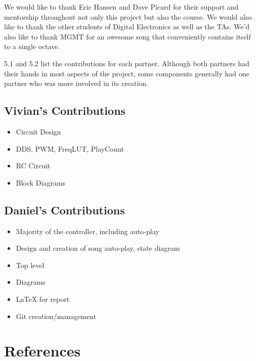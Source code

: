 \documentclass{article}
\begin{document}
  We would like to thank Eric Hansen and Dave Picard for their support and mentorship throughout not only this project but also the course. We would also like to thank the other students of Digital Electronics as well as the TAs. We'd also like to thank MGMT for an awesome song that conveniently contains itself to a single octave.

  5.1 and 5.2 list the contributions for each partner. Although both partners had their hands in most aspects of the project, some components generally had one partner who was more involved in its creation.

  \subsection{Vivian's Contributions}
    \begin{itemize}
      \item Circuit Design
      \item DDS, PWM, FreqLUT, PlayCount
      \item RC Circuit
      \item Block Diagrams
    \end{itemize}

  \subsection{Daniel's Contributions}
    \begin{itemize}
      \item Majority of the controller, including auto-play
      \item Design and creation of song auto-play, state diagram
      \item Top level
      \item Diagrams
      \item LaTeX for report
      \item Git creation/management
    \end{itemize}

\newpage
\section{References}

\end{document}

